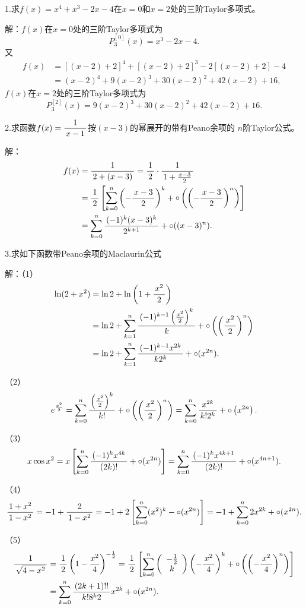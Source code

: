 \bigskip

1.求$f(x)=x^4+x^3-2x-4$在$x=0$和$x=2$处的三阶Taylor多项式。

解：$f(x)$在$x=0$处的三阶Taylor多项式为
$$P^{[0]}_3(x)=x^3-2x-4.$$
又
\begin{align*}
	f(x)&=[(x-2)+2]^4+[(x-2)+2]^3-2[(x-2)+2]-4\\
	&=(x-2)^4+9(x-2)^3+30(x-2)^2+42(x-2)+16,
\end{align*}
$f(x)$在$x=2$处的三阶Taylor多项式为
$$P^{[2]}_3(x)=9(x-2)^3+30(x-2)^2+42(x-2)+16.$$
\fin

\bigskip

2.求函数$f(x)=\displaystyle\frac{\,{1}\,}{\,{x-1}\,}$按$(x-3)$的幂展开的带有Peano余项的
$n$阶Taylor公式。

解：
\begin{align*}
	f(x)&=\displaystyle\frac{\,{1}\,}{\,{2+(x-3)}\,}=\displaystyle\frac{\,{1}\,}{\,{2}\,}\cdot\displaystyle\frac{\,{1}\,}{\,{1+\frac{x-3}2}\,}\\
	&=\displaystyle\frac{\,{1}\,}{\,{2}\,}\left[\sum\limits_{k=0}^n\left(-\displaystyle\frac{\,{x-3}\,}{\,{2}\,}\right)^k
	+\circ\left(\left(-\displaystyle\frac{\,{x-3}\,}{\,{2}\,}\right)^n\right)\right]\\
	&=\sum\limits_{k=0}^n\displaystyle\frac{\,{(-1)^k(x-3)^k}\,}{\,{2^{k+1}}\,}+\circ((x-3)^n).
\end{align*}
\fin

\bigskip

3.求如下函数带Peano余项的Maclaurin公式

解：（1）
\begin{align*}
	\ln(2+x^2)&=\ln2+\ln\left(1+\displaystyle\frac{\,{x^2}\,}{\,{2}\,}\right)\\
	&=\ln2+\sum\limits_{k=1}^n\displaystyle\frac{\,{(-1)^{k-1}\left(\frac{x^2}{2}\right)^k}\,}{\,{k}\,}
	+\circ\left(\left(\displaystyle\frac{\,{x^2}\,}{\,{2}\,}\right)^n\right)\\
	&=\ln2+\sum\limits_{k=1}^n\displaystyle\frac{\,{(-1)^{k-1}x^{2k}}\,}{\,{k2^k}\,}
	+\circ(x^{2n}).
\end{align*}

（2）
$$
	e^{\frac{x^2}2}
	=\sum\limits_{k=0}^n\displaystyle\frac{\,{\left(\frac{x^2}2\right)^k}\,}{\,{k!}\,}
	+\circ\left(\left(\displaystyle\frac{\,{x^2}\,}{\,{2}\,}\right)^n\right)
	=\sum\limits_{k=0}^n\displaystyle\frac{\,{x^{2k}}\,}{\,{k!2^k}\,}
	+\circ\left(x^{2n}\right).
$$

（3）
$$
	x\cos x^2
	=x\left[\sum\limits_{k=0}^n\displaystyle\frac{\,{(-1)^kx^{4k}}\,}{\,{(2k)!}\,}
	+\circ(x^{2n})\right]
	=\sum\limits_{k=0}^n\displaystyle\frac{\,{(-1)^kx^{4k+1}}\,}{\,{(2k)!}\,}
	+\circ(x^{4n+1}).
$$

（4）
$$
	\displaystyle\frac{\,{1+x^2}\,}{\,{1-x^2}\,}
	=-1+\displaystyle\frac{\,{2}\,}{\,{1-x^2}\,}
	=-1+2\left[\sum\limits_{k=0}^n(x^2)^k-\circ(x^{2n})\right]
	=-1+\sum\limits_{k=0}^n2x^{2k}+\circ(x^{2n}).
$$

（5）
\begin{align*}
	\displaystyle\frac{\,{1}\,}{\,{\sqrt{4-x^2}}\,}
	&=\displaystyle\frac{\,{1}\,}{\,{2}\,}\left(1-\frac{x^2}4\right)^{-\frac12}
	=\displaystyle\frac{\,{1}\,}{\,{2}\,}\left[\sum\limits_{k=0}^n\left(\begin{array}{c}
		-\frac12 \\ k
	\end{array}\right)\left(-\displaystyle\frac{\,{x^2}\,}{\,{4}\,}\right)^k
	+\circ\left(\left(-\displaystyle\frac{\,{x^2}\,}{\,{4}\,}\right)^n\right)
	\right]\\
	&=\sum\limits_{k=0}^n\displaystyle\frac{\,{(2k+1)!!}\,}{\,{k!8^k2}\,}x^{2k}
	+\circ(x^{2n}).
\end{align*}

